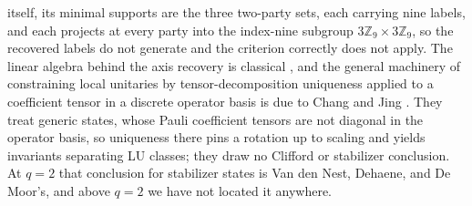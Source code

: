 itself, its minimal supports are the three two-party sets, each carrying
nine labels, and each projects at every party into the index-nine subgroup
\(3\mathbb Z_9\times3\mathbb Z_9\), so the recovered labels do not generate
and the criterion correctly does not apply.
The linear algebra behind the axis recovery is classical
\cite{Harshman1970,Kruskal1977}, and the general machinery of constraining
local unitaries by tensor-decomposition uniqueness applied to a coefficient
tensor in a discrete operator basis is due to Chang and Jing
\cite{ChangJing2022}.  They treat generic states, whose Pauli coefficient
tensors are not diagonal in the operator basis, so uniqueness there pins a
rotation up to scaling and yields invariants separating LU classes; they
draw no Clifford or stabilizer conclusion.  At \(q=2\) that conclusion for
stabilizer states is Van den Nest, Dehaene, and De Moor's, and above \(q=2\)
we have not located it anywhere.
